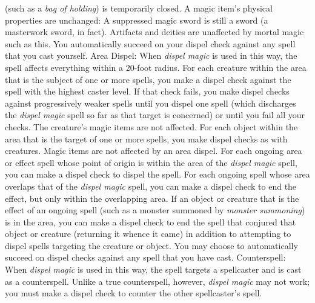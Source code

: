 (such as a \textit{bag of holding}) is temporarily closed. A magic item's physical
properties are unchanged: A suppressed magic sword is still a sword (a masterwork
sword, in fact). Artifacts and deities are unaffected by mortal magic such as this.
You automatically succeed on your dispel check against any spell that you cast
yourself.
Area Dispel: When \textit{dispel magic} is used in this way, the spell
affects everything within a 20-foot radius.
For each creature within the area that is the subject of one or more spells, you
make a dispel check against the spell with the highest caster level. If that check
fails, you make dispel checks against progressively weaker spells until you dispel
one spell (which discharges the \textit{dispel magic} spell so far as that target
is concerned) or until you fail all your checks. The creature's magic items are
not affected.
For each object within the area that is the target of one or more spells, you make
dispel checks as with creatures. Magic items are not affected by an area dispel.
For each ongoing area or effect spell whose point of origin is within the area
of the \textit{dispel magic} spell, you can make a dispel check to dispel the spell.
For each ongoing spell whose area overlaps that of the \textit{dispel magic} spell,
you can make a dispel check to end the effect, but only within the overlapping
area.
If an object or creature that is the effect of an ongoing spell (such as a monster
summoned by \textit{monster summoning}) is in the area, you can make a dispel check
to end the spell that conjured that object or creature (returning it whence it
came) in addition to attempting to dispel spells targeting the creature or object.
You may choose to automatically succeed on dispel checks against any spell that
you have cast.
Counterspell: When \textit{dispel magic} is used in this way, the spell
targets a spellcaster and is cast as a counterspell. Unlike a true counterspell,
however, \textit{dispel magic} may not work; you must make a dispel check to counter
the other spellcaster's spell.